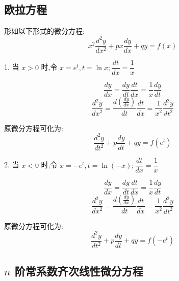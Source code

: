 \subsection{欧拉方程}
\begin{definition}[欧拉方程]\label{def: 欧拉方程}
	形如以下形式的微分方程:
	$$x^{2}\dfrac{d^{2}y}{dx^2}+px\dfrac{dy}{dx}+qy=f(x)$$

	1. 当 $x>0$ 时,令 $x=e^t,t=\ln x;\dfrac{dt}{dx}=\dfrac{1}{x}$

	$$\dfrac{dy}{dx}=\dfrac{dy}{dt}\dfrac{dt}{dx}=\dfrac{1}{x}\dfrac{dy}{dt}$$
	$$\dfrac{d^{2}y}{dx^2}=\dfrac{d(\frac{dy}{dx})}{dt}\dfrac{dt}{dx}=\dfrac{1}{x^2}\dfrac{d^{2}y}{dt^2}$$

	原微分方程可化为:
	$$\dfrac{d^{2}y}{dt^2}+p\dfrac{dy}{dt}+qy=f(e^t)$$

	2. 当 $x<0$ 时,令 $x=-e^t,t=\ln(-x);\dfrac{dt}{dx}=\dfrac{1}{x}$

	$$\dfrac{dy}{dx}=\dfrac{dy}{dt}\dfrac{dt}{dx}=\dfrac{1}{x}\dfrac{dy}{dt}$$
	$$\dfrac{d^{2}y}{dx^2}=\dfrac{d(\frac{dy}{dx})}{dt}\dfrac{dt}{dx}=\dfrac{1}{x^2}\dfrac{d^{2}y}{dt^2}$$

	原微分方程可化为:
	$$\dfrac{d^{2}y}{dt^2}+p\dfrac{dy}{dt}+qy=f(-e^t)$$
\end{definition}
\subsection{$n$ 阶常系数齐次线性微分方程}



